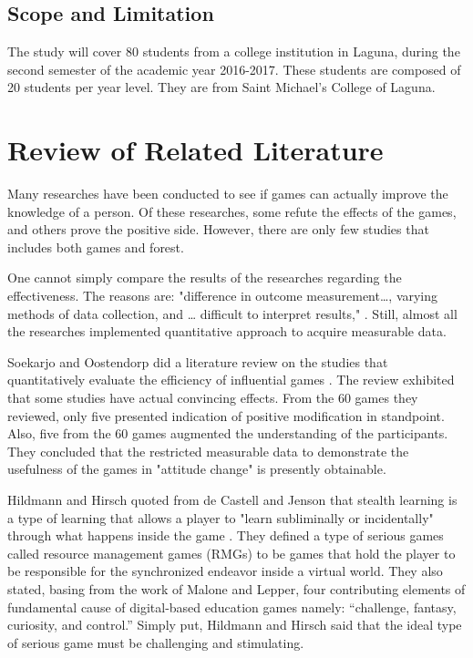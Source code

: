 \documentclass[journal]{./IEEE/IEEEtran}
\begin{document}
\subsection{Scope and Limitation}
The study will cover 80 students from a college institution in Laguna, during the second semester of the academic year 2016-2017. These students are composed of 20 students per year level. They are from Saint Michael's College of Laguna. %

\section{Review of Related Literature}
Many researches have been conducted to see if games can actually improve the knowledge of a person. Of these researches, some refute the effects of the games, and others prove the positive side. However, there are only few studies that includes both games and forest.

One cannot simply compare the results of the researches regarding the effectiveness. The reasons are: "difference in outcome measurement…, varying methods of data collection, and … difficult to interpret results," \cite{all2014measuring}. Still, almost all the researches implemented quantitative approach to acquire measurable data.

Soekarjo and Oostendorp did a literature review on the studies that quantitatively evaluate the efficiency of influential games \cite{soekarjo2015measuring}. The review exhibited that some studies have actual convincing effects. From the 60 games they reviewed, only five presented indication of positive modification in standpoint. Also, five from the 60 games augmented the understanding of the participants. They concluded that the restricted measurable data to demonstrate the usefulness of the games in "attitude change" is presently obtainable.

Hildmann and Hirsch quoted from de Castell and Jenson that stealth learning is a type of learning that allows a player to "learn subliminally or incidentally" through what happens inside the game \cite{hildmann2008raising}. They defined a type of serious games called resource management games (RMGs) to be games that hold the player to be responsible for the synchronized endeavor inside a virtual world. They also stated, basing from the work of Malone and Lepper, four contributing elements of fundamental cause of digital-based education games namely: “challenge, fantasy, curiosity, and control.” Simply put, Hildmann and Hirsch said that the ideal type of serious game must be challenging and stimulating.
\end{document}
